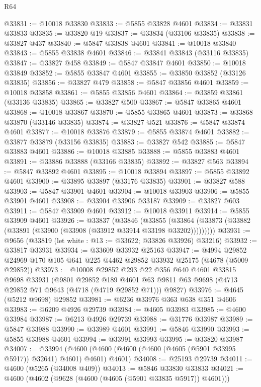\begin{lexlean}{R64}
\begin{coremodule}
@33831 := @10018 @33830
@33833 := @5855 @33828 @4601
@33834 := @33831 @33833
@33835 := @33820 @19
@33837 := @33834 (@33106 @33835)
@33838 := @33827 @437
@33840 := @5847 @33838 @4601
@33841 := @10018 @33840
@33843 := @5855 @33838 @4601
@33846 := @33841 @33843 (@33116 @33835)
@33847 := @33827 @458
@33849 := @5847 @33847 @4601
@33850 := @10018 @33849
@33852 := @5855 @33847 @4601
@33855 := @33850 @33852 (@33126 @33835)
@33856 := @33827 @479
@33858 := @5847 @33856 @4601
@33859 := @10018 @33858
@33861 := @5855 @33856 @4601
@33864 := @33859 @33861 (@33136 @33835)
@33865 := @33827 @500
@33867 := @5847 @33865 @4601
@33868 := @10018 @33867
@33870 := @5855 @33865 @4601
@33873 := @33868 @33870 (@33146 @33835)
@33874 := @33827 @521
@33876 := @5847 @33874 @4601
@33877 := @10018 @33876
@33879 := @5855 @33874 @4601
@33882 := @33877 @33879 (@33156 @33835)
@33883 := @33827 @542
@33885 := @5847 @33883 @4601
@33886 := @10018 @33885
@33888 := @5855 @33883 @4601
@33891 := @33886 @33888 (@33166 @33835)
@33892 := @33827 @563
@33894 := @5847 @33892 @4601
@33895 := @10018 @33894
@33897 := @5855 @33892 @4601
@33900 := @33895 @33897 (@33176 @33835)
@33901 := @33827 @588
@33903 := @5847 @33901 @4601
@33904 := @10018 @33903
@33906 := @5855 @33901 @4601
@33908 := @33904 @33906 @33187
@33909 := @33827 @603
@33911 := @5847 @33909 @4601
@33912 := @10018 @33911
@33914 := @5855 @33909 @4601
@33926 := @33837
    (@33846
      (@33855 (@33864 (@33873 (@33882 (@33891 (@33900 (@33908 (@33912 @33914 @33198 @33202)))))))))
@33931 := @9656 (@33819 (let white : @13 := @33622; @33826 @33926) @33216)
@33932 := @33817 @33931
@33934 := @33609 @33932 @25163
@33947 := @4994 @29852 @24969 @170 @105 @641 @225 @4462 @29852 @33932 @25175 (@4678 (@5009 @29852))
@33973 := @10008
    @29852
    @293
    @22
    @356
    @640
    @4601
    @33815
    @9698
    @33931
    (@9801
      @29852
      @189
      @4601
      @63
      @9811
      @63
      @9698
      (@4713 @29852 @71 @9643 (@4718 (@4719 @29852 @71)))
      @9827)
@33976 := @4645 (@5212 @9698) @29852
@33981 := @6236 @33976 @363 @638 @351 @4606
@33983 := @6209 @4926 @29739
@33984 := @4605 @33983
@33985 := @4600 @33984
@33987 := @6213 @4926 @29739
@33988 := @31776 @33987
@33989 := @5847 @33988
@33990 := @33989 @4601
@33991 := @5846 @33990
@33993 := @5855 @33988 @4601
@33994 := @33991 @33993
@33995 := @33820 @33987
@34007 := @33994
    (@4600 (@4600 (@4600 (@4600 (@4605 (@5901 @33995 @5917)) @32641) @4601) @4601) @4601)
@34008 := @25193 @29739
@34011 := @4600 (@5265 (@34008 @409))
@34013 := @5846 @33830 @33833
@34021 := @4600 (@4602 (@9628 (@4600 (@4605 (@5901 @33835 @5917)) @4601)))

\end{coremodule}
\end{lexlean}
